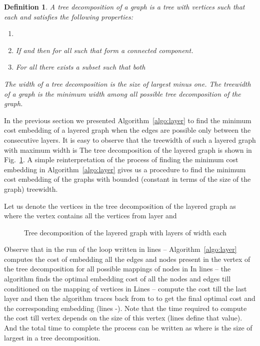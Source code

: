 \documentclass[journal]{IEEEtran}
\newtheorem{definition}{{\bf Definition}}
\begin{document}
\begin{definition}
  A tree decomposition of a graph 
  is a tree  with vertices  such that each  and satisfies the following properties:
\begin{enumerate}
  \item 
  \item If  and  then  for all 
    such that  form a connected component.
  \item For all  there exists a subset 
    such that both 
  \end{enumerate}
The width of a tree decomposition is the size of largest  minus
  one. The treewidth  of a graph is the minimum width among all
  possible tree decomposition of the graph.
\end{definition}


In the previous section we presented Algorithm~\ref{algo:layer} to
find the minimum cost embedding of a layered graph when the edges are
possible only between the consecutive layers. It is easy to observe
that the treewidth of such a layered graph with maximum width  is
 The tree decomposition of the layered graph is shown in
Fig.~\ref{fig:layertree}. A simple reinterpretation of the process of
finding the minimum cost embedding in Algorithm~\ref{algo:layer} gives
us a procedure to find the minimum cost embedding of the graphs with
bounded (constant in terms of the size of the graph) treewidth.

Let us denote the vertices in the tree decomposition of the layered
graph as  where the vertex  contains all the
vertices from layer  and 
\begin{figure}[tbp]
  \centering
{}
  \caption{Tree decomposition of the layered graph with  layers of
    width  each}
  \label{fig:layertree}
\end{figure}
Observe that in the  run of the loop written in lines
-- Algorithm~\ref{algo:layer} computes the cost of embedding
all the edges and nodes present in the vertex  of the tree
decomposition for all possible mappings of nodes in  In lines
-- the algorithm finds the optimal embedding cost of all the
nodes and edges till  conditioned on the mapping of vertices in
 Lines -- compute the cost till the last
layer and then the algorithm traces back from  to  to
get the final optimal cost and the corresponding embedding (lines
-). Note that the time required to compute the cost till
vertex  depends on the size of this vertex (lines  define
that value). And the total time to complete the process can be written
as  where  is the size of largest  in a tree
decomposition.
\end{document}
